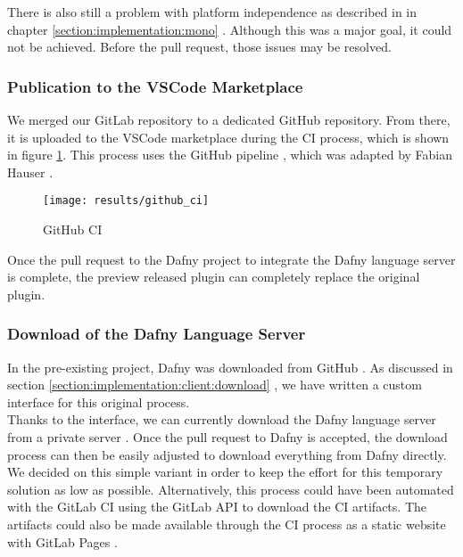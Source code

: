 There is also still a problem with platform independence as described in in chapter
\ref{section:implementation:mono} \textendash{} .
Although this was a major goal, it could not be achieved.
Before the pull request, those issues may be resolved.


\subsubsection{Publication to the VSCode Marketplace}
We merged our GitLab repository to a dedicated GitHub repository.
From there, it is uploaded to the VSCode marketplace during the CI process, which is shown in figure \ref{fig:github_ci}.
This process uses the GitHub pipeline , which
was adapted by Fabian Hauser \cite{our-dafny-plugin-github-publish}.

\begin{figure}[H]
    \centering
    \texttt{[image: results/github\_ci]}
    \caption{GitHub CI}
    \label{fig:github_ci}
\end{figure}

Once the pull request to the Dafny project to integrate the Dafny language server is complete,
the preview released plugin can completely replace the original plugin.

\subsubsection{Download of the Dafny Language Server}
In the pre-existing project, Dafny was downloaded from GitHub \cite{dafny_lang_builds}.
As discussed in section \ref{section:implementation:client:download} \textendash{} ,
we have written a custom interface for this original process.\\

Thanks to the interface, we can currently download the Dafny language server from a private server \cite{client-serverStringResources}.
Once the pull request to Dafny is accepted, the download process can then be easily adjusted to download everything from Dafny directly.\\

We decided on this simple variant in order to keep the effort for this temporary solution as low as possible.
Alternatively, this process could have been automated with the GitLab CI using the GitLab API \cite{gitlab-api} to download the CI artifacts.
The artifacts could also be made available through the CI process as a static website with GitLab Pages \cite{gitlab-pages}.


